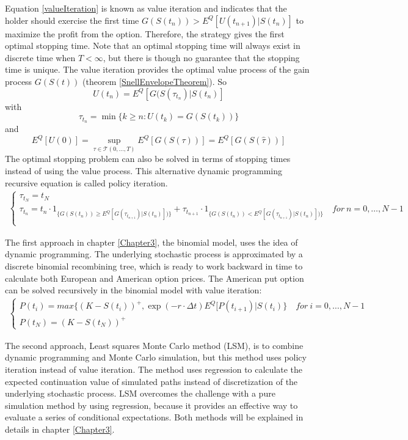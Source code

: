 Equation \eqref{valueIteration} is known as value iteration and indicates that the holder should exercise the first time $G(S(t_n))> E^Q[U(t_{n+1})|S(t_n)]$ to maximize the profit from the option. Therefore, the strategy gives the first optimal stopping time. Note that an optimal stopping time will always exist in discrete time when $T<\infty$, but there is though no guarantee that the stopping time is unique. The value iteration provides the optimal value process of the gain process $G(S(t))$ (theorem \ref{SnellEnvelopeTheorem}). So 
$$U(t_n)=E^Q[G(S(\tau_{t_n})|S(t_n)]$$ with 
$$\tau_{t_n}=\min \{ k \geq n : U(t_k) = G(S(t_k)) \}$$ and 
$$E^Q[U(0)]= \sup_{\tau \in \mathcal{T}(0,\ldots, T)} E^Q[G(S(\tau))]=E^Q[G(S(\hat{\tau}))]$$ 
The optimal stopping problem can also be solved in terms of stopping times instead of using the value process. This alternative dynamic programming recursive equation is called policy iteration.
\begin{equation}\label{policyIteration}
\begin{split}
\begin{cases}
          \tau_{t_N} = t_N\\
          \tau_{t_n} = t_n \cdot 1_{\{G(S(t_n)) \geq E^Q[G(\tau_{t_{n+1}})|S(t_n)])\}} + \tau_{t_{n+1}} \cdot 1_{\{G(S(t_n)) < E^Q[G(\tau_{t_{n+1}})|S(t_n)])\}} \quad for \ n={0,\ldots,N-1} \\ 
\end{cases}
\end{split}
\end{equation}

The first approach in chapter \ref{Chapter3}, the binomial model, uses the idea of dynamic programming. The underlying stochastic process is approximated by a discrete binomial recombining tree, which is ready to work backward in time to calculate both European and American option prices. The American put option can be solved recursively in the binomial model with value iteration: 
\begin{equation}\label{BellmanEq}
\begin{split}
\begin{cases}
          P(t_i) = max\{ (K-S(t_i))^+, \exp(-r\cdot \Delta t) E^Q[P(t_{i+1})|S(t_i)\} \quad for \ i={0,\ldots,N-1} \\
          P(t_N) = (K-S(t_N))^+ 
\end{cases}
\end{split}
\end{equation}

The second approach, Least squares Monte Carlo method (LSM), is to combine dynamic programming and Monte Carlo simulation, but this method uses policy iteration instead of value iteration. The method uses regression to calculate the expected continuation value of simulated paths instead of discretization of the underlying stochastic process. LSM overcomes the challenge with a pure simulation method by using regression, because it provides an effective way to evaluate a series of conditional expectations. Both methods will be explained in details in chapter \ref{Chapter3}.






